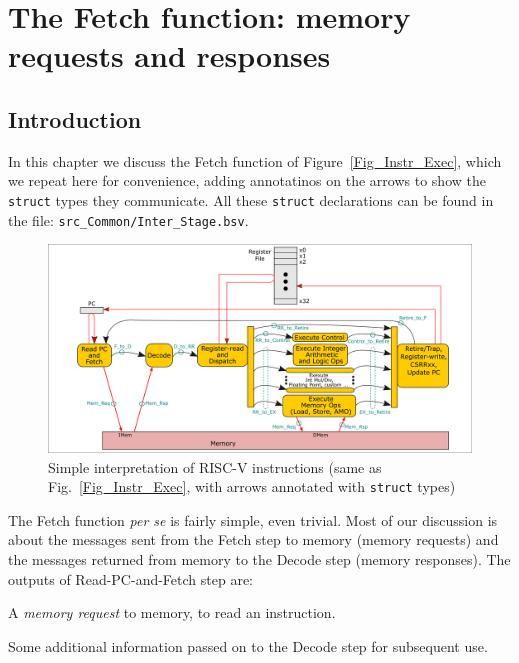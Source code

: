 

\chapter{The Fetch function: memory requests and responses}


\setcounter{page}{1}
\renewcommand{\thepage}{\arabic{chapter}-\arabic{page}}

\label{ch_Fetch_function}


\section{Introduction}

In this chapter we discuss the Fetch function of
Figure~\ref{Fig_Instr_Exec}, which we repeat here for convenience,
adding annotatinos on the arrows to show the \verb|struct| types they
communicate. All these \verb|struct| declarations can be found in the
file: \verb|src_Common/Inter_Stage.bsv|.
\begin{figure}[htbp]
  \centerline{\includegraphics[width=6in,angle=0]{ch030_RISCV_Design_Space/Figures/Fig_Instr_Exec_w_structs}}
  \caption{\label{Fig_Fetch_function_Simple_Instr_Exec}Simple interpretation of RISC-V instructions (same as Fig.~\ref{Fig_Instr_Exec}, with arrows annotated with {\tt struct} types)}
\end{figure}

The Fetch function \emph{per se} is fairly simple, even trivial.  Most
of our discussion is about the messages sent from the Fetch step to
memory (memory requests) and the messages returned from memory to the
Decode step (memory responses). The outputs of Read-PC-and-Fetch step
are:
\begin{tightlist}

 \item A \emph{memory request} to memory, to read an instruction.

 \item Some additional information passed on to the Decode step for subsequent use.

\end{tightlist}

